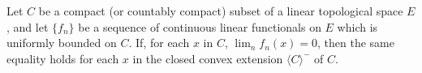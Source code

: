 Let $C$ be a compact (or countably compact) subset of a linear topological space $E$, and let $\{f_n\}$ be a sequence of continuous linear functionals on $E$ which is uniformly bounded on $C$. If, for each $x$ in $C$, $\lim_{n} f_n(x) = 0$, then the same equality holds for each $x$ in the closed convex extension $\langle C \rangle^-$ of $C$.

